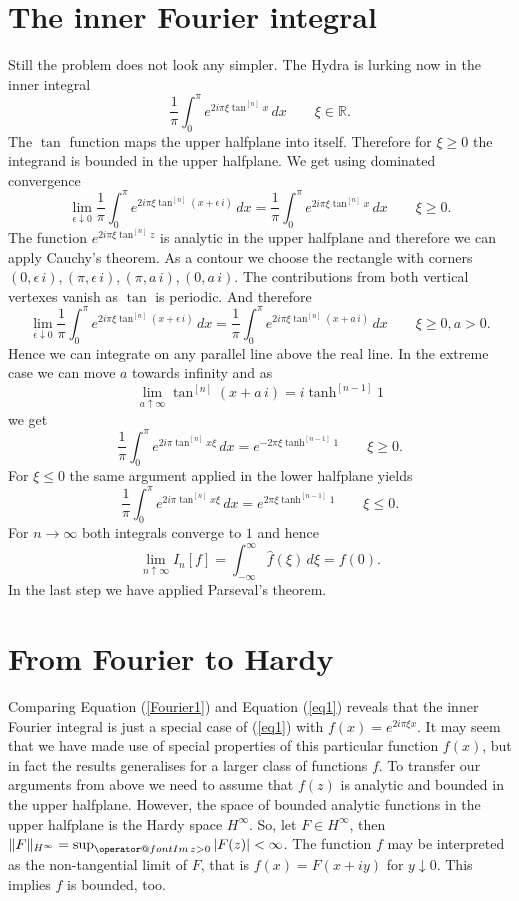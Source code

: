 \documentclass{amsart}
\makeatletter
\theoremstyle{plain}
\numberwithin{equation}{section}
\newcommand{\R}{{\mathbb  R}}
\renewcommand{\leq}{\leqslant}
\renewcommand{\geq}{\geqslant}
\renewcommand{\Im}{{\operator@font Im\,}}
\makeatother
\begin{document}
\section{The inner Fourier integral}
Still the problem does not look any simpler. The Hydra is lurking now in the inner integral
\begin{equation}\label{Fourier1}
\frac{1}{\pi} \int_0^\pi  e^{2 i \pi \xi \tan^{[n]}x} \,dx \qquad \xi \in \R.
\end{equation}
The $\tan$ function maps the upper halfplane into itself.
Therefore for $\xi \geq 0$ the integrand is bounded in the upper halfplane. We get using dominated convergence
\[
\lim_{\epsilon\downarrow 0} \frac{1}{\pi} \int_0^\pi  e^{2 i \pi \xi \tan^{[n]}(x+\epsilon\,i)} \,dx =  \frac{1}{\pi} \int_0^\pi  e^{2 i \pi \xi \tan^{[n]}x} \,dx \qquad \xi \geq 0.
\]
The function  $e^{2 i \pi \xi \tan^{[n]}z}$ is analytic in the upper halfplane and therefore we can apply Cauchy's theorem.
As a contour we choose the rectangle with corners $(0,\epsilon\,i),(\pi,\epsilon\,i),(\pi,a\,i),(0,a\,i)$. 
The contributions from both vertical vertexes vanish as $\tan$ is periodic. And therefore
\[
\lim_{\epsilon\downarrow 0}  \frac{1}{\pi} \int_0^\pi  e^{2 i \pi \xi \tan^{[n]}(x+\epsilon\,i)} \,dx = \frac{1}{\pi} \int_0^\pi  e^{2 i \pi \xi \tan^{[n]}(x+a\,i)} \,dx \qquad \xi \geq 0, a > 0.
\]
Hence we can integrate on any parallel line above the real line. In the extreme case we can move $a$ towards infinity and as
\[
\lim_{a \uparrow \infty} \tan^{[n]}(x+a\,i)= i \tanh^{[n-1]}1
\]
we get
\[
\frac{1}{\pi} \int_0^\pi  e^{2 i \pi \tan^{[n]}x \xi} \,dx = e^{-2 \pi \xi \tanh^{[n-1]}1} \qquad \xi \geq 0.
\]
For $\xi \leq 0$ the same argument applied in the lower halfplane yields
\[
\frac{1}{\pi} \int_0^\pi  e^{2 i \pi \tan^{[n]}x \xi} \,dx = e^{2 \pi \xi \tanh^{[n-1]}1} \qquad \xi \leq 0.
\]
For $n \to \infty$ both integrals converge to $1$ and hence
\[
\lim_{n \uparrow \infty} I_n[f] = \int_{-\infty}^\infty \hat f(\xi)\,d\xi = f(0).
\]  
In the last step we have applied Parseval's theorem.

\section{From Fourier to Hardy}
Comparing Equation (\ref{Fourier1}) and Equation (\ref{eq1}) reveals that the inner Fourier integral is just a special case of (\ref{eq1}) with $f(x) = e^{2 i \pi \xi x}$.
It may seem that we have made use of special properties of this particular function $f(x)$, but in fact the results generalises for a larger class of functions $f$.
To transfer our arguments from above we need to assume that $f(z)$ is analytic and bounded in the upper halfplane. 
However, the space of bounded analytic functions in the upper halfplane is the Hardy space $H^{\infty}$. 
So, let $F \in H^\infty$, then $\|F\|_{H^\infty} = \sup_{\Im z > 0}|F(z)| < \infty$. The function $f$ may be interpreted as the non-tangential limit of $F$, that is $f(x) = F(x+iy)$ for $y \downarrow 0$. This implies $f$ is bounded, too.
\end{document}

